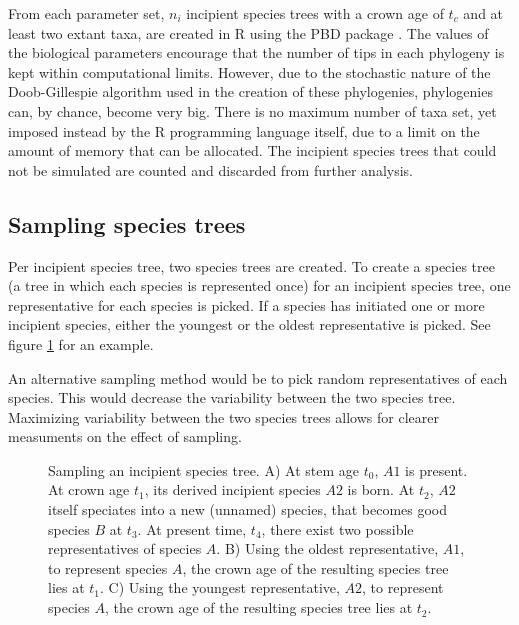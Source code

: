 From each parameter set, $n_i$ incipient species trees with a crown age
of $t_c$ and at least two extant taxa, 
are created in R \cite{R} using the PBD package \cite{PBD}.
The values of the biological parameters encourage that the number of tips in
each phylogeny is kept within computational limits. However, due to
the stochastic nature of the Doob-Gillespie algorithm used in the creation
of these phylogenies, phylogenies can, by chance, become very big. 
There is no maximum number of taxa set, yet imposed instead by the R 
programming language itself, due to a limit on the amount of memory that can be 
allocated. The incipient species trees that could not be simulated are
counted and discarded from further analysis.  

\subsection{Sampling species trees}
\label{subsec:sampling_species_trees}

Per incipient species tree, two species trees are created. 
To create a species tree (a tree in which each species is represented once)
for an incipient species tree, one representative for each species is picked. 
If a species has initiated one or more incipient species, either the youngest
or the oldest representative is picked. See figure \ref{fig:sampling} for an example.

An alternative sampling method would be to pick 
random representatives of each species. This would decrease the variability
between the two species tree. Maximizing variability between the two
species trees allows for clearer measuments on the effect of sampling.   

\begin{figure}
  \centering 
  \CreateTikzFigureSampling{}
  \caption{
    Sampling an incipient species tree. 
    A) At stem age $t_0$, $A1$ is present.
    At crown age $t_1$, its derived incipient species $A2$ is born. 
    At $t_2$, $A2$ itself speciates into a new (unnamed) species, 
    that becomes good species $B$ at $t_3$. At present time, $t_4$, there
    exist two possible representatives of species $A$. 
    B) Using the oldest representative, $A1$, to represent species $A$, the crown
    age of the resulting species tree lies at $t_1$. 
    C) Using the youngest representative, $A2$, to represent species $A$, the crown
    age of the resulting species tree lies at $t_2$. 
  }
  \label{fig:sampling}
\end{figure}

